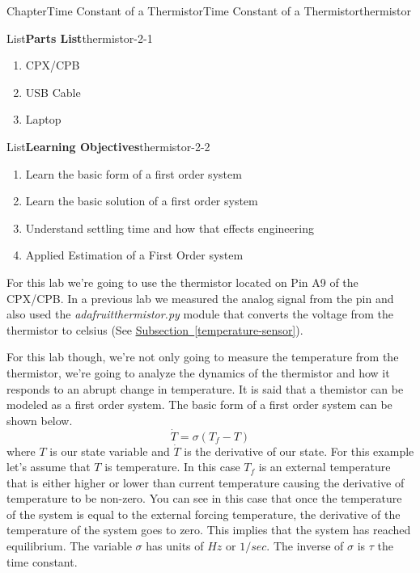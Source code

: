 \documentclass[oneside,10pt,]{book}
\newcommand{\xreffont}{\relax}
\newcommand{\linkhilite}[1]{\underline{#1}}
\numberwithin{equation}{section}
\begin{document}
\begin{chapterptx}{Chapter}{Time Constant of a Thermistor}{}{Time Constant of a Thermistor}{}{}{thermistor}
\renewcommand*{\chaptername}{Chapter}
\begin{introduction}{}%
\begin{listptx}{List}{\textbf{Parts List}}{thermistor-2-1}{}%
%
\begin{enumerate}
\item{}CPX\slash{}CPB%
\item{}USB Cable%
\item{}Laptop%
\end{enumerate}
\end{listptx}%
\begin{listptx}{List}{\textbf{Learning Objectives}}{thermistor-2-2}{}%
%
\begin{enumerate}
\item{}Learn the basic form of a first order system%
\item{}Learn the basic solution of a first order system%
\item{}Understand settling time and how that effects engineering%
\item{}Applied Estimation of a First Order system%
\end{enumerate}
\end{listptx}%
For this lab we're going to use the thermistor located on Pin A9 of the CPX\slash{}CPB. In a previous lab we measured the analog signal from the pin and also used the \emph{adafruit\textunderscore{}thermistor.py} module that converts the voltage from the thermistor to celsius (See \hyperref[temperature-sensor]{\linkhilite{Subsection~{\xreffont\ref{temperature-sensor}}}}).%
\par
For this lab though, we're not only going to measure the temperature from the thermistor, we're going to analyze the dynamics of the thermistor and how it responds to an abrupt change in temperature. It is said that a themistor can be modeled as a first order system. The basic form of a first order system can be shown below.%
\begin{equation}
\dot{T} = \sigma (T_f - T)\label{thermistor-2-4-1}
\end{equation}
where \(T\) is our state variable and \(\dot{T}\) is the derivative of our state. For this example let's assume that \(T\) is temperature. In this case \(T_f\) is an external temperature that is either higher or lower than current temperature causing the derivative of temperature to be non-zero. You can see in this case that once the temperature of the system is equal to the external forcing temperature, the derivative of the temperature of the system goes to zero. This implies that the system has reached equilibrium. The variable \(\sigma\) has units of \(Hz\) or \(1/sec\). The inverse of \(\sigma\) is \(\tau\) the time constant.%

\end{introduction}
\end{chapterptx}
\end{document}
